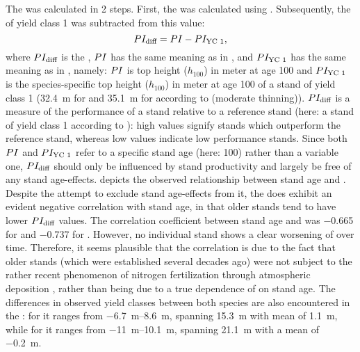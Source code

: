 The \ProductivityIndexVariableText{} was calculated in 2 steps.  First, the \ProductivityIndexText{} was calculated using .  Subsequently, the \ProductivityIndexText{} of yield class 1 was subtracted from this value:
\begin{equation}
  \label{eq:ProductivityIndexVariable}
  PI_{\text{diff}}{} = PI{} - PI_{\text{YC 1}}{},
\end{equation}
where \(PI_{\text{diff}}{}\) is the \ProductivityIndexVariableText{}, \(PI{}\) has the same meaning as in , and \(PI_{\text{YC 1}}{}\) has the same meaning as in , namely:  \(PI{}\) is top height (\(h_{100}\)) in meter at age \SI{100}{\year} and \(PI_{\text{YC 1}}{}\) is the species-specific top height (\(h_{100}\)) in meter at age \SI{100}{\year} of a stand of yield class 1 (\SI{32.4}{\meter} for \Beech{} and \SI{35.1}{\meter} for \Spruce{} according to \textcite{Schober1995} (moderate thinning)).  \(PI_{\text{diff}}{}\) is a measure of the performance of a stand relative to a reference stand (here: a stand of yield class 1 according to \textcite{Schober1995}): high values signify stands which outperform the reference stand, whereas low values indicate low performance stands.  Since both \(PI{}\) and \(PI_{\text{YC 1}}{}\) refer to a specific stand age (here: \SI{100}{\year}) rather than a variable one, \(PI_{\text{diff}}{}\) should only be influenced by stand productivity and largely be free of any stand age-effects.   depicts the observed relationship between stand age and \ProductivityIndexVariableText{}.  Despite the attempt to exclude stand age-effects from it, the \ProductivityIndexVariableText{} does exhibit an evident negative correlation with stand age, in that older stands tend to have lower \(PI_{\text{diff}}{}\) values. The correlation coefficient between stand age and \ProductivityIndexVariableText{} was \num{-0.665} for \Beech{} and \num{-0.737} for \Spruce{}.  However, no individual stand shows a clear worsening of \ProductivityIndexVariableText{} over time.  Therefore, it seems plausible that the correlation is due to the fact that older stands (which were established several decades ago) were not subject to the rather recent phenomenon of nitrogen fertilization through atmospheric deposition \parencite{Kenk1988}, rather than being due to a true dependence of \ProductivityIndexVariableText{} on stand age.  The differences in observed yield classes between both species are also encountered in the \ProductivityIndexVariableText{}:  for \Beech{} it ranges from \SIrange{-6.7}{8.6}{\meter}, spanning \SI{15.3}{\meter} with mean of \SI{1.1}{\meter}, while for \Spruce{} it ranges from \SIrange{-11}{10.1}{\meter}, spanning \SI{21.1}{\meter} with a mean of \SI{-0.2}{\meter}.

